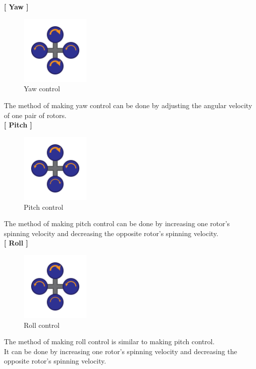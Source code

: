 \textbf{[ Yaw ]}\\
\begin{figure}[H]

  \centering
    \includegraphics[width=0.3\textwidth]{../Pictures/yaw.png}
    \caption{Yaw control}
\end{figure}
The method of making yaw control can be done by adjusting the angular velocity of one pair of rotors.\\
\textbf{[ Pitch ]}\\
\begin{figure}[H]

  \centering
    \includegraphics[width=0.3\textwidth]{../Pictures/pitch.png}
    \caption{Pitch control}
\end{figure}
The method of making pitch control can be done by increasing one rotor's spinning velocity and decreasing the opposite rotor's spinning velocity.\\
\textbf{[ Roll ]}\\
\begin{figure}[H]

  \centering
    \includegraphics[width=0.3\textwidth, angle=90]{../Pictures/pitch.png}
    \caption{Roll control}
\end{figure}
The method of making roll control is similar to making pitch control.\\
It can be done by increasing one rotor's spinning velocity and decreasing the opposite rotor's spinning velocity.\\

